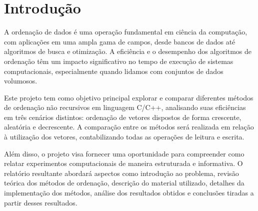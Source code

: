 \section{Introdução}
A ordenação de dados é uma operação fundamental em ciência da computação, com aplicações em uma ampla gama de campos, desde bancos de dados até algoritmos de busca e otimização. A eficiência e o desempenho dos algoritmos de ordenação têm um impacto significativo no tempo de execução de sistemas computacionais, especialmente quando lidamos com conjuntos de dados volumosos.

Este projeto tem como objetivo principal explorar e comparar diferentes métodos de ordenação não recursivos em linguagem C/C++, analisando suas eficiências em três cenários distintos: ordenação de vetores dispostos de forma crescente, aleatória e decrescente. A comparação entre os métodos será realizada em relação à utilização dos vetores, contabilizando todas as operações de leitura e escrita.

Além disso, o projeto visa fornecer uma oportunidade para compreender como relatar experimentos computacionais de maneira estruturada e informativa. O relatório resultante abordará aspectos como introdução ao problema, revisão teórica dos métodos de ordenação, descrição do material utilizado, detalhes da implementação dos métodos, análise dos resultados obtidos e conclusões tiradas a partir desses resultados.
